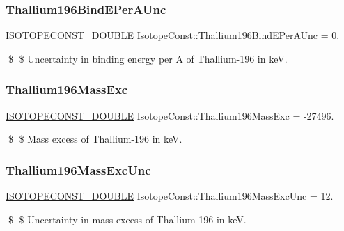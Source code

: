 \subsubsection{\texorpdfstring{Thallium196\+Bind\+E\+Per\+A\+Unc}{Thallium196BindEPerAUnc}}
{\footnotesize\ttfamily \mbox{\hyperlink{group___isotope_const-_macros_ga8f45a7272ce02c0b4c65c44636ed719a}{I\+S\+O\+T\+O\+P\+E\+C\+O\+N\+S\+T\+\_\+\+D\+O\+U\+B\+LE}} Isotope\+Const\+::\+Thallium196\+Bind\+E\+Per\+A\+Unc = 0.}

\$ \$ Uncertainty in binding energy per A of Thallium-\/196 in keV. \mbox{\label{group___isotope_const-_thallium-_tl196_ga0503ec91b69e7c47eb035a111f4795f5}} 
\subsubsection{\texorpdfstring{Thallium196\+Mass\+Exc}{Thallium196MassExc}}
{\footnotesize\ttfamily \mbox{\hyperlink{group___isotope_const-_macros_ga8f45a7272ce02c0b4c65c44636ed719a}{I\+S\+O\+T\+O\+P\+E\+C\+O\+N\+S\+T\+\_\+\+D\+O\+U\+B\+LE}} Isotope\+Const\+::\+Thallium196\+Mass\+Exc = -\/27496.}

\$ \$ Mass excess of Thallium-\/196 in keV. \mbox{\label{group___isotope_const-_thallium-_tl196_ga1c4f3587f57f8eefb1b0cae9feca1d48}} 
\subsubsection{\texorpdfstring{Thallium196\+Mass\+Exc\+Unc}{Thallium196MassExcUnc}}
{\footnotesize\ttfamily \mbox{\hyperlink{group___isotope_const-_macros_ga8f45a7272ce02c0b4c65c44636ed719a}{I\+S\+O\+T\+O\+P\+E\+C\+O\+N\+S\+T\+\_\+\+D\+O\+U\+B\+LE}} Isotope\+Const\+::\+Thallium196\+Mass\+Exc\+Unc = 12.}

\$ \$ Uncertainty in mass excess of Thallium-\/196 in keV. \mbox{\label{group___isotope_const-_thallium-_tl196_ga6d1ae5d872507461b1c466ad291e3e7f}} 
